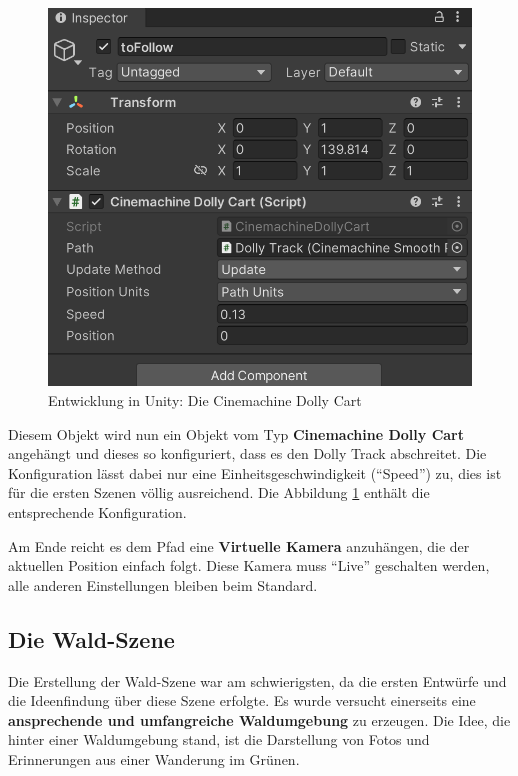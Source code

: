 \begin{figure}
    \centering
    \includegraphics[scale=0.15]{pics/unity-cinemachine-dolly-cart.png}
    \caption{Entwicklung in Unity: Die Cinemachine Dolly Cart}
    \label{fig:unity-cinemachine-dolly-cart}
\end{figure}


Diesem Objekt wird nun ein Objekt vom Typ \textbf{Cinemachine Dolly Cart} angehängt und dieses so konfiguriert, dass es den Dolly Track abschreitet. Die Konfiguration lässt dabei nur eine Einheitsgeschwindigkeit (``Speed'') zu, dies ist für die ersten Szenen völlig ausreichend. Die Abbildung \ref{fig:unity-cinemachine-dolly-cart} enthält die entsprechende Konfiguration.

Am Ende reicht es dem Pfad eine \textbf{Virtuelle Kamera} anzuhängen, die der aktuellen Position einfach folgt. Diese Kamera muss ``Live'' geschalten werden, alle anderen Einstellungen bleiben beim Standard.



\subsection{Die Wald-Szene}

Die Erstellung der Wald-Szene war am schwierigsten, da die ersten Entwürfe und die Ideenfindung über diese Szene erfolgte. Es wurde versucht einerseits eine \textbf{ansprechende und umfangreiche Waldumgebung} zu erzeugen. Die Idee, die hinter einer Waldumgebung stand, ist die Darstellung von Fotos und Erinnerungen aus einer Wanderung im Grünen.



